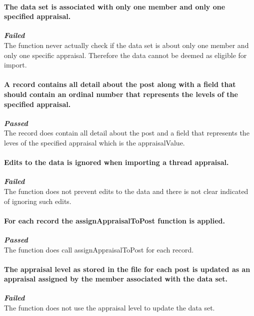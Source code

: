 \paragraph{\color{black} The data set is associated with only one member and only one specified appraisal.\\}
\color{red}
\textbf{\small \emph{Failed}} \\
\color{black} The function never actually check if the data set is about only one member and only one specific appraisal. Therefore the data cannot be deemed as eligible for import.
\par

\paragraph{\color{black}A record contains all detail about the post along with a field that should contain an ordinal number that represents the levels of the specified appraisal.\\}
\color{green}
\textbf{\small \emph{Passed}} \\
\color{black}The record does contain all detail about the post and a field that represents the leves of the specified appraisal which is the appraisalValue.
\par

\paragraph{\color{black} Edits to the data is ignored when importing a thread appraisal.\\}
\color{red}
\textbf{\small \emph{Failed}} \\
\color{black} The function does not prevent edits to the data and there is not clear indicated of ignoring such edits.
\par

\paragraph{\color{black}For each record the assignAppraisalToPost function is applied.\\}
\color{green}
\textbf{\small \small \emph{Passed}} \\
\color{black}The function does call assignAppraisalToPost for each record.
\par

\paragraph{\color{black}The appraisal level as stored in the file for each post is updated as an appraisal assigned by the member associated with the data set.\\}
\color{red}
\textbf{\small \emph{Failed}} \\
\color{black}The function does not use the appraisal level to update the data set.
\par

